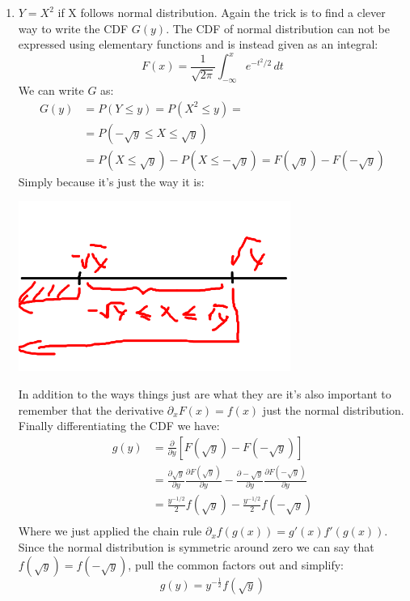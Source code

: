 \documentclass{article}
\newcommand{\1}{\mathbf{1}}
\begin{document}
\begin{enumerate}
    \newpage
    \item $Y=X^2$ if X follows normal distribution. Again the trick is to find a clever way to write the CDF $G(y)$. The CDF of normal distribution can not be expressed using elementary functions and is instead given as an integral:
    $$F(x) = \frac 1 {\sqrt{2\pi}} \int_{-\infty}^x e^{-t^2/2} \, dt$$
    We can write $G$ as:
    \begin{align*}
        G(y) &= P(Y\leq y) = P(X^2 \leq y) = \\
             &= P(-\sqrt{y} \leq X \leq \sqrt{y}) \\
             &= P(X \leq \sqrt{y}) - P( X\leq -\sqrt{y}) = F(\sqrt{y}) - F(-\sqrt{y})
    \end{align*}
    Simply because it's just the way it is: 
    \begin{center}
        \includegraphics[width=3.5in]{HW2Figures/Picasso.png}
    \end{center}
    In addition to the ways things just are what they are it's also important to remember that the derivative $\partial_x F(x) = f(x)$ just the normal distribution. Finally differentiating the CDF we have:
    \begin{align*}
        g(y) &= \frac{\partial}{\partial y} \left[F(\sqrt y) - F(- \sqrt y) \right] \\
             &=  \frac{\partial \sqrt y }{\partial y} \frac{\partial F(\sqrt y) }{\partial y} - \frac{\partial - \sqrt y}{\partial y} \frac{\partial F(- \sqrt y) }{\partial y} \\
             & = \frac{y^{-1/2}}{2} f(\sqrt y) -  \frac{y^{-1/2}}{2} f(-\sqrt y) \\
    \end{align*}
    Where we just applied the chain rule $\partial_x f(g(x)) = g'(x) f'(g(x))$. Since the normal distribution is symmetric around zero we can say that $f(\sqrt y) = f(-\sqrt y)$, pull the common factors out and simplify:
    $$g(y) = y^{-\frac{1}{2}} f(\sqrt y)$$
\end{enumerate}
\end{document}
